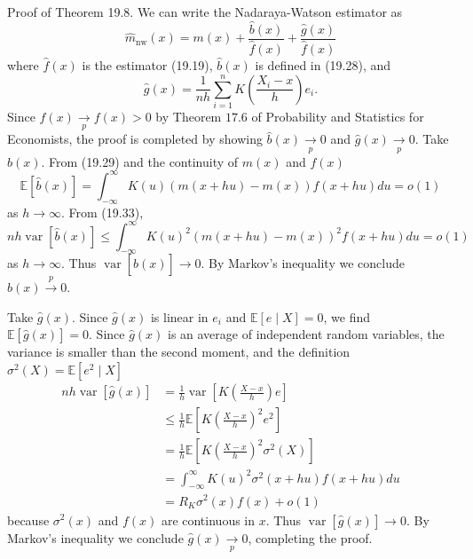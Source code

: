 \documentclass[10pt]{article}
\begin{document}
Proof of Theorem 19.8. We can write the Nadaraya-Watson estimator as
$$
\widehat{m}_{\mathrm{nw}}(x)=m(x)+\frac{\widehat{b}(x)}{\widehat{f}(x)}+\frac{\widehat{g}(x)}{\widehat{f}(x)}
$$
where $\widehat{f}(x)$ is the estimator (19.19), $\widehat{b}(x)$ is defined in (19.28), and
$$
\widehat{g}(x)=\frac{1}{n h} \sum_{i=1}^{n} K\left(\frac{X_{i}-x}{h}\right) e_{i} .
$$
Since $\widehat{f}(x) \underset{p}{\longrightarrow} f(x)>0$ by Theorem $17.6$ of Probability and Statistics for Economists, the proof is completed by showing $\widehat{b}(x) \underset{p}{\longrightarrow} 0$ and $\widehat{g}(x) \underset{p}{\longrightarrow} 0$. Take $\widehat{b}(x)$. From (19.29) and the continuity of $m(x)$ and $f(x)$
$$
\mathbb{E}[\widehat{b}(x)]=\int_{-\infty}^{\infty} K(u)(m(x+h u)-m(x)) f(x+h u) d u=o(1)
$$
as $h \rightarrow \infty$. From (19.33),
$$
n h \operatorname{var}[\widehat{b}(x)] \leq \int_{-\infty}^{\infty} K(u)^{2}(m(x+h u)-m(x))^{2} f(x+h u) d u=o(1)
$$
as $h \rightarrow \infty$. Thus $\operatorname{var}[\widehat{b}(x)] \longrightarrow 0$. By Markov's inequality we conclude $\widehat{b}(x) \stackrel{p}{\longrightarrow} 0$.

Take $\widehat{g}(x)$. Since $\widehat{g}(x)$ is linear in $e_{i}$ and $\mathbb{E}[e \mid X]=0$, we find $\mathbb{E}[\widehat{g}(x)]=0$. Since $\widehat{g}(x)$ is an average of independent random variables, the variance is smaller than the second moment, and the definition $\sigma^{2}(X)=\mathbb{E}\left[e^{2} \mid X\right]$
$$
\begin{aligned}
n h \operatorname{var}[\widehat{g}(x)] &=\frac{1}{h} \operatorname{var}\left[K\left(\frac{X-x}{h}\right) e\right] \\
& \leq \frac{1}{h} \mathbb{E}\left[K\left(\frac{X-x}{h}\right)^{2} e^{2}\right] \\
&=\frac{1}{h} \mathbb{E}\left[K\left(\frac{X-x}{h}\right)^{2} \sigma^{2}(X)\right] \\
&=\int_{-\infty}^{\infty} K(u)^{2} \sigma^{2}(x+h u) f(x+h u) d u \\
&=R_{K} \sigma^{2}(x) f(x)+o(1)
\end{aligned}
$$
because $\sigma^{2}(x)$ and $f(x)$ are continuous in $x$. Thus $\operatorname{var}[\widehat{g}(x)] \longrightarrow 0$. By Markov's inequality we conclude $\widehat{g}(x) \underset{p}{\longrightarrow} 0$, completing the proof.
\end{document}

